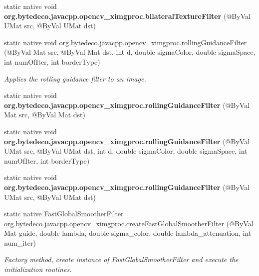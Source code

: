 \begin{DoxyCompactItemize}
\item 
\mbox{\label{group__ximgproc__filters_ga1575730ac8aff645e3f3b76fd673c500}} 
static native void {\bfseries org.\+bytedeco.\+javacpp.\+opencv\+\_\+ximgproc.\+bilateral\+Texture\+Filter} (@By\+Val U\+Mat src, @By\+Val U\+Mat dst)
\item 
static native void \hyperlink{group__ximgproc__filters_ga2ce496356d7b8cd485c04de402fdb8f5}{org.\+bytedeco.\+javacpp.\+opencv\+\_\+ximgproc.\+rolling\+Guidance\+Filter} (@By\+Val Mat src, @By\+Val Mat dst, int d, double sigma\+Color, double sigma\+Space, int num\+Of\+Iter, int border\+Type)
\begin{DoxyCompactList}\small\item\em Applies the rolling guidance filter to an image. \end{DoxyCompactList}\item 
\mbox{\label{group__ximgproc__filters_gab88e3c0024c5b2f69549f1af38bba209}} 
static native void {\bfseries org.\+bytedeco.\+javacpp.\+opencv\+\_\+ximgproc.\+rolling\+Guidance\+Filter} (@By\+Val Mat src, @By\+Val Mat dst)
\item 
\mbox{\label{group__ximgproc__filters_ga927b6149cbd138b97b8727528fa33ca8}} 
static native void {\bfseries org.\+bytedeco.\+javacpp.\+opencv\+\_\+ximgproc.\+rolling\+Guidance\+Filter} (@By\+Val U\+Mat src, @By\+Val U\+Mat dst, int d, double sigma\+Color, double sigma\+Space, int num\+Of\+Iter, int border\+Type)
\item 
\mbox{\label{group__ximgproc__filters_ga57797ace6d9600f46d033c69f98e0d44}} 
static native void {\bfseries org.\+bytedeco.\+javacpp.\+opencv\+\_\+ximgproc.\+rolling\+Guidance\+Filter} (@By\+Val U\+Mat src, @By\+Val U\+Mat dst)
\item 
static native Fast\+Global\+Smoother\+Filter \hyperlink{group__ximgproc__filters_ga2464410b399f5f54dfce61987cfaa67e}{org.\+bytedeco.\+javacpp.\+opencv\+\_\+ximgproc.\+create\+Fast\+Global\+Smoother\+Filter} (@By\+Val Mat guide, double lambda, double sigma\+\_\+color, double lambda\+\_\+attenuation, int num\+\_\+iter)
\begin{DoxyCompactList}\small\item\em Factory method, create instance of Fast\+Global\+Smoother\+Filter and execute the initialization routines. \end{DoxyCompactList}\item 

\end{DoxyCompactItemize}
